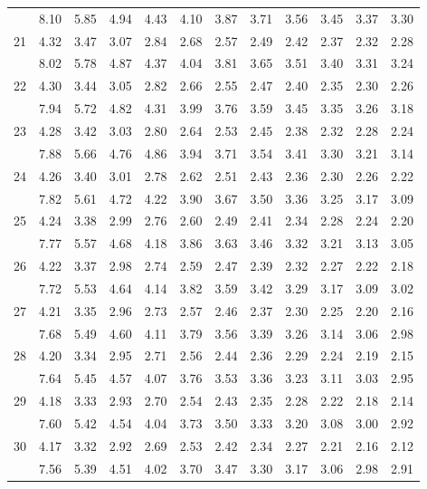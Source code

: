 \documentclass[lang=cn,10pt]{elegantbook}
\begin{document}
\begin{longtable}{c|ccccccccccc}
       & 8.10 & 5.85 & 4.94 & 4.43 & 4.10 & 3.87 & 3.71 & 3.56 & 3.45 & 3.37 & 3.30 \\
    21 & 4.32 & 3.47 & 3.07 & 2.84 & 2.68 & 2.57 & 2.49 & 2.42 & 2.37 & 2.32 & 2.28 \\
       & 8.02 & 5.78 & 4.87 & 4.37 & 4.04 & 3.81 & 3.65 & 3.51 & 3.40 & 3.31 & 3.24 \\
    22 & 4.30 & 3.44 & 3.05 & 2.82 & 2.66 & 2.55 & 2.47 & 2.40 & 2.35 & 2.30 & 2.26 \\
       & 7.94 & 5.72 & 4.82 & 4.31 & 3.99 & 3.76 & 3.59 & 3.45 & 3.35 & 3.26 & 3.18 \\
    23 & 4.28 & 3.42 & 3.03 & 2.80 & 2.64 & 2.53 & 2.45 & 2.38 & 2.32 & 2.28 & 2.24 \\
       & 7.88 & 5.66 & 4.76 & 4.86 & 3.94 & 3.71 & 3.54 & 3.41 & 3.30 & 3.21 & 3.14 \\
    24 & 4.26 & 3.40 & 3.01 & 2.78 & 2.62 & 2.51 & 2.43 & 2.36 & 2.30 & 2.26 & 2.22 \\
       & 7.82 & 5.61 & 4.72 & 4.22 & 3.90 & 3.67 & 3.50 & 3.36 & 3.25 & 3.17 & 3.09 \\
    25 & 4.24 & 3.38 & 2.99 & 2.76 & 2.60 & 2.49 & 2.41 & 2.34 & 2.28 & 2.24 & 2.20 \\
       & 7.77 & 5.57 & 4.68 & 4.18 & 3.86 & 3.63 & 3.46 & 3.32 & 3.21 & 3.13 & 3.05 \\
    26 & 4.22 & 3.37 & 2.98 & 2.74 & 2.59 & 2.47 & 2.39 & 2.32 & 2.27 & 2.22 & 2.18 \\
       & 7.72 & 5.53 & 4.64 & 4.14 & 3.82 & 3.59 & 3.42 & 3.29 & 3.17 & 3.09 & 3.02 \\
    27 & 4.21 & 3.35 & 2.96 & 2.73 & 2.57 & 2.46 & 2.37 & 2.30 & 2.25 & 2.20 & 2.16 \\
       & 7.68 & 5.49 & 4.60 & 4.11 & 3.79 & 3.56 & 3.39 & 3.26 & 3.14 & 3.06 & 2.98 \\
    28 & 4.20 & 3.34 & 2.95 & 2.71 & 2.56 & 2.44 & 2.36 & 2.29 & 2.24 & 2.19 & 2.15 \\
       & 7.64 & 5.45 & 4.57 & 4.07 & 3.76 & 3.53 & 3.36 & 3.23 & 3.11 & 3.03 & 2.95 \\
    29 & 4.18 & 3.33 & 2.93 & 2.70 & 2.54 & 2.43 & 2.35 & 2.28 & 2.22 & 2.18 & 2.14 \\
       & 7.60 & 5.42 & 4.54 & 4.04 & 3.73 & 3.50 & 3.33 & 3.20 & 3.08 & 3.00 & 2.92 \\
    30 & 4.17 & 3.32 & 2.92 & 2.69 & 2.53 & 2.42 & 2.34 & 2.27 & 2.21 & 2.16 & 2.12 \\
       & 7.56 & 5.39 & 4.51 & 4.02 & 3.70 & 3.47 & 3.30 & 3.17 & 3.06 & 2.98 & 2.91 \\

\end{longtable}
\end{document}
